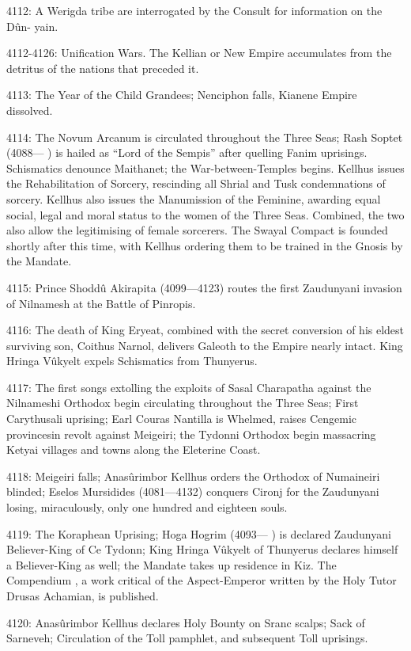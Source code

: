 \documentclass[]{book}
\begin{document}
4112: A Werigda tribe are interrogated by the Consult for information on the Dûn-
yain.

4112-4126: Unification Wars. The Kellian or New Empire accumulates from the
detritus of the nations that preceded it.

4113: The Year of the Child Grandees; Nenciphon falls, Kianene Empire dissolved.

4114: The Novum Arcanum is circulated throughout the Three Seas; Rash
Soptet (4088--- ) is hailed as ``Lord of the Sempis'' after quelling Fanim
uprisings. Schismatics denounce Maithanet; the War-between-Temples begins.
Kellhus issues the Rehabilitation of Sorcery, rescinding all Shrial and Tusk
condemnations of sorcery. Kellhus also issues the Manumission of the
Feminine, awarding equal social, legal and moral status to the women of the
Three Seas. Combined, the two also allow the legitimising of female sorcerers.
The Swayal Compact is founded shortly after this time, with Kellhus ordering
them to be trained in the Gnosis by the Mandate.

4115: Prince Shoddû Akirapita (4099---4123) routes the first Zaudunyani invasion of
Nilnamesh at the Battle of Pinropis.

4116: The death of King Eryeat, combined with the secret conversion of his eldest
surviving son, Coithus Narnol, delivers Galeoth to the Empire nearly intact.
King Hringa Vûkyelt expels Schismatics from Thunyerus.

4117: The first songs extolling the exploits of Sasal Charapatha against the
Nilnameshi Orthodox begin circulating throughout the Three Seas; First
Carythusali uprising; Earl Couras Nantilla is Whelmed, raises Cengemic
provincesin revolt against Meigeiri; the Tydonni Orthodox begin massacring
Ketyai villages and towns along the Eleterine Coast.

4118: Meigeiri falls; Anasûrimbor Kellhus orders the Orthodox of Numaineiri
blinded; Eselos Mursidides (4081---4132) conquers Cironj for the Zaudunyani
losing, miraculously, only one hundred and eighteen souls.

4119: The Koraphean Uprising; Hoga Hogrim (4093--- ) is declared Zaudunyani
Believer-King of Ce Tydonn; King Hringa Vûkyelt of Thunyerus declares
himself a Believer-King as well; the Mandate takes up residence in Kiz. The
Compendium , a work critical of the Aspect-Emperor written by the Holy Tutor
Drusas Achamian, is published.

4120: Anasûrimbor Kellhus declares Holy Bounty on Sranc scalps; Sack of Sarneveh;
Circulation of the Toll pamphlet, and subsequent Toll uprisings.
\end{document}
